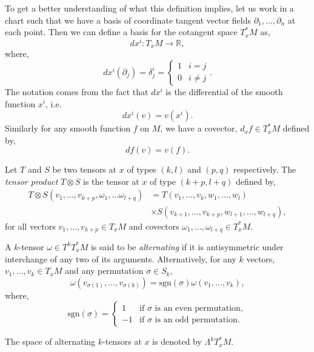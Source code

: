 To get a better understanding of what this definition implies, let us work in a chart such that we have a basis of coordinate tangent vector fields $\partial_1,\ldots,\partial_n$ at each point. Then we can define a basis for the cotangent space $T^*_xM$ as,
\[
dx^i:T_xM\to\mathbb{R},
\]
where,
\[
dx^i(\partial_j)=\delta^i_j=\begin{cases}
1 & i=j\\
0 & i\neq j
\end{cases}.
\]
The notation comes from the fact that $dx^i$ is the differential of the smooth function $x^i$, i.e.
\[
dx^i(v)=v(x^i).
\]
Similarly for any smooth function $f$ on $M$, we have a covector, $d_xf\in T^*_xM$ defined by,
\[
df(v)=v(f).
\]
\begin{definition}
Let $T$ and $S$ be two tensors at $x$ of types $(k,l)$ and $(p,q)$ respectively. The \textit{tensor product} $T\otimes S$ is the tensor at $x$ of type $(k+p,l+q)$ defined by,
\begin{align*}
T\otimes S(v_1,\ldots,v_{k+p},\omega_1,\ldots\omega_{l+q})&=T\left(v_1,\ldots,v_k,w_1,\ldots,w_l \right)\\
&\times S\left(v_{k+1},\ldots,v_{k+p},w_{l+1},\ldots,w_{l+q} \right),
\end{align*}
for all vectors $v_1,\ldots,v_{k+p}\in T_xM$ and covectors $\omega_1,\ldots,\omega_{l+q}\in T^*_xM$.
\end{definition}
\begin{definition}
A $k$-tensor $\omega\in T^kT^*_xM$ is said to be \textit{alternating} if it is antisymmetric under interchange of any two of its arguments. Alternatively, for any $k$ vectors, $v_1,\ldots,v_k\in T_xM$ and any permutation $\sigma\in S_k$,
\[
\omega(v_{\sigma(1)},\ldots,v_{\sigma(k)})=\mathrm{sgn}(\sigma)\omega(v_1,\ldots,v_k),
\]
where,
\[
\mathrm{sgn}(\sigma)=\begin{cases}
1 & \text{if }\sigma\text{ is an even permutation},\\
-1 & \text{if }\sigma\text{ is an odd permutation}.
\end{cases}
\]
\end{definition}
The space of alternating $k$-tensors at $x$ is denoted by $\Lambda^kT^*_xM$.

